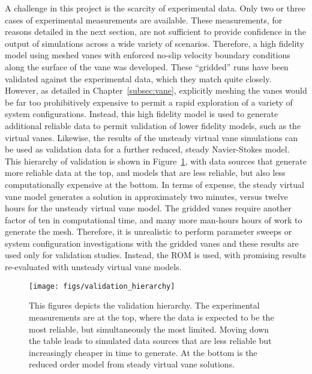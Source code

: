 A challenge in this project is the scarcity of experimental data. Only
two or three cases of experimental measurements are available. These
measurements, for reasons detailed in the next section, are not
sufficient to provide confidence in the output of simulations across a
wide variety  of scenarios. Therefore, a high fidelity model using 
meshed vanes with enforced no-slip velocity boundary conditions along
the surface of the vane was developed. These ``gridded'' runs have
been validated against the experimental data, which they match quite
closely. However, as detailed in Chapter~\ref{subsec:vane}, 
explicitly meshing the vanes would be far too 
prohibitively expensive to permit a rapid exploration of a variety of
system configurations. Instead, this high fidelity model is used 
to generate additional reliable data to permit validation of lower
fidelity models, such as the virtual vanes. Likewise, the results of the
unsteady virtual vane simulations can be used as validation data for a
further reduced, steady Navier-Stokes model. This hierarchy of
validation is shown in Figure~\ref{fig:val_hier}, with data sources that
generate more reliable data at the top, and models that are less
reliable, but also less computationally expensive at the bottom. In
terms of expense, the steady virtual vane model generates a solution in
approximately two minutes, versus twelve hours for the unsteady virtual
vane model. The gridded vanes require another factor of ten in
computational time, and many more man-hours hours of work to generate
the mesh. Therefore, it is unrealistic to perform parameter sweeps or
system configuration investigations with the gridded vanes and these
results are used only for validation studies. Instead, the
ROM is used, with promising results re-evaluated with unsteady virtual
vane models. %

%
%
 \begin{figure}[!htb]
   \begin{center}
    \texttt{[image: figs/validation\_hierarchy]}
    \caption{This figures depicts the validation hierarchy. The
    experimental measurements 
    are at the top, where the data is expected to be the most reliable,
    but simultaneously the most limited. Moving down the table leads to
    simulated data sources that are less reliable but increasingly
    cheaper in time to generate. At the bottom is the reduced order
    model from steady virtual vane solutions.} 
    \label{fig:val_hier}
   \end{center}
 \end{figure}

